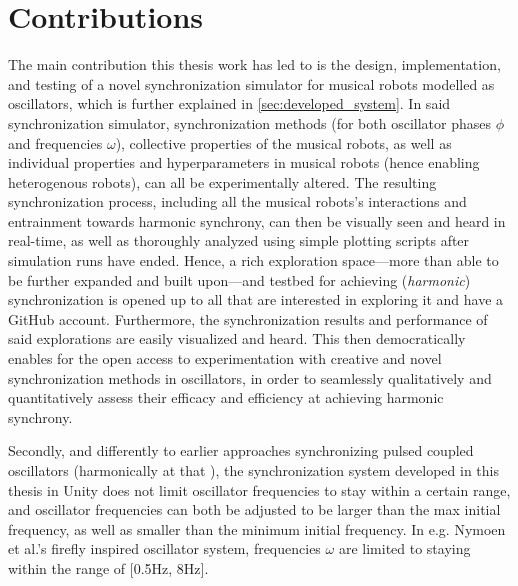 \section{Contributions}

The main contribution this thesis work has led to is the design, implementation, and testing of a novel synchronization simulator for musical robots modelled as oscillators, which is further explained in \ref{sec:developed_system}. In said synchronization simulator, synchronization methods (for both oscillator phases $\phi$ and frequencies $\omega$), collective properties of the musical robots, as well as individual properties and hyperparameters in musical robots (hence enabling heterogenous robots), can all be experimentally altered. The resulting synchronization process, including all the musical robots's interactions and entrainment towards harmonic synchrony, can then be visually seen and heard in real-time, as well as thoroughly analyzed using simple plotting scripts after simulation runs have ended. Hence, a rich exploration space—more than able to be further expanded and built upon—and testbed for achieving (\textit{harmonic}) synchronization is opened up to all that are interested in exploring it and have a GitHub account. Furthermore, the synchronization results and performance of said explorations are easily visualized and heard. This then democratically enables for the open access to experimentation with creative and novel synchronization methods in oscillators, in order to seamlessly qualitatively and quantitatively assess their efficacy and efficiency at achieving harmonic synchrony.

Secondly, and differently to earlier approaches synchronizing pulsed coupled oscillators (harmonically at that \cite{nymoen_synch}), the synchronization system developed in this thesis in Unity does not limit oscillator frequencies to stay within a certain range, and oscillator frequencies can both be adjusted to be larger than the max initial frequency, as well as smaller than the minimum initial frequency. In e.g. Nymoen et al.'s firefly inspired oscillator system, frequencies $\omega$ are limited to staying within the range of $[$0.5Hz, 8Hz$]$.

